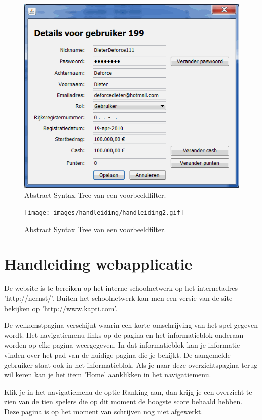 \begin{figure}[h!]
	\centering
		\includegraphics[width=\textwidth]{images/handleiding/handleiding3.gif}
	\caption{Abstract Syntax Tree van een voorbeeldfilter.}
\end{figure}

\begin{figure}[h!]
	\centering
		\texttt{[image: images/handleiding/handleiding2.gif]}
	\caption{Abstract Syntax Tree van een voorbeeldfilter.}
\end{figure}

\chapter{Handleiding webapplicatie}

De website is te bereiken op het interne schoolnetwerk op het internetadres 'http://nernst/'.
Buiten het schoolnetwerk kan men een versie van de site bekijken op 'http://www.kapti.com'.

De welkomstpagina verschijnt waarin een korte omschrijving van het spel gegeven wordt. Het navigatiemenu links op de pagina en het informatieblok onderaan worden op elke pagina weergegeven. In dat informatieblok kan je informatie vinden over het pad van de huidige pagina die je bekijkt. De aangemelde gebruiker staat ook in het informatieblok. Als je naar deze overzichtspagina terug wil keren kan je het item 'Home' aanklikken in het navigatiemenu.

Klik je in het navigatiemenu de optie Ranking aan, dan krijg je een overzicht te zien van de tien spelers die op dit moment de hoogste score behaald hebben.
Deze pagina is op het moment van schrijven nog niet afgewerkt.

